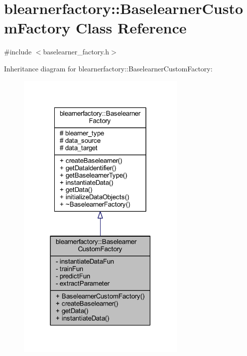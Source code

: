 \hypertarget{classblearnerfactory_1_1_baselearner_custom_factory}{}\section{blearnerfactory\+:\+:Baselearner\+Custom\+Factory Class Reference}
\label{classblearnerfactory_1_1_baselearner_custom_factory}


{\ttfamily \#include $<$baselearner\+\_\+factory.\+h$>$}



Inheritance diagram for blearnerfactory\+:\+:Baselearner\+Custom\+Factory\+:
\nopagebreak
\begin{figure}[H]
\begin{center}
\leavevmode
\includegraphics[width=230pt]{classblearnerfactory_1_1_baselearner_custom_factory__inherit__graph}
\end{center}
\end{figure}


